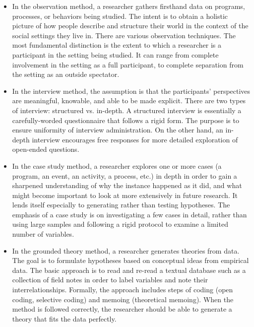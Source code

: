 \begin{itemize}
	\item In the observation method, a researcher gathers firsthand data on programs, processes, or behaviors being studied. The intent is to obtain a holistic picture of how people describe and structure their world in the context of the social settings they live in. There are various observation techniques. The most fundamental distinction is the extent to which a researcher is a participant in the setting being studied. It can range from complete involvement in the setting as a full participant, to complete separation from the setting as an outside spectator.
	
	\item In the interview method, the assumption is that the participants' perspectives are meaningful, knowable, and able to be made explicit. There are two types of interview: structured vs. in-depth. A structured interview is essentially a carefully-worded questionnaire that follows a rigid form. The purpose is to ensure uniformity of interview administration. On the other hand, an in-depth interview encourages free responses for more detailed exploration of open-ended questions.
	
	\item In the case study method, a researcher explores one or more cases (a program, an event, an activity, a process, etc.) in depth in order to gain a sharpened understanding of why the instance happened as it did, and what might become important to look at more extensively in future research. It lends itself especially to generating rather than testing hypotheses. The emphasis of a case study is on investigating a few cases in detail, rather than using large samples and following a rigid protocol to examine a limited number of variables.
 
	\item In the grounded theory method, a researcher generates theories from data. The goal is to formulate hypotheses based on conceptual ideas from empirical data. The basic approach is to read and re-read a textual database such as a collection of field notes in order to label variables and note their interrelationships. Formally, the approach includes steps of coding (open coding, selective coding) and memoing (theoretical memoing). When the method is followed correctly, the researcher should be able to generate a theory that fits the data perfectly.
	
\end{itemize}

